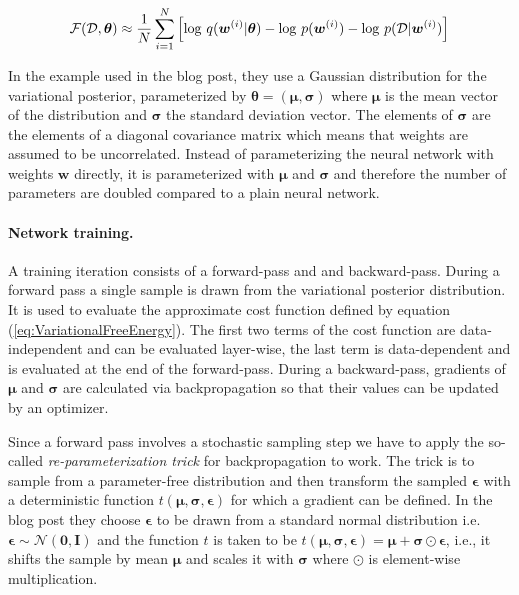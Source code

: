\documentclass[%
oneside,                 %
final,                   %
10pt]{article}
\begin{document}
\begin{equation} 
\mathcal{F}(\mathcal{D},\boldsymbol{\theta}) \approx {1 \over N} \sum_{i=1}^N \left[
\log \, q(\boldsymbol{w}^{(i)} \lvert \boldsymbol{\theta}) -
\log \, p(\boldsymbol{w}^{(i)}) -
\log \, p(\mathcal{D} \lvert \boldsymbol{w}^{(i)})\right]
\label{eq:VariationalFreeEnergy}
\end{equation}

In the example used in the blog post, they use a Gaussian distribution for the variational posterior, parameterized by $\boldsymbol{\theta} = (\boldsymbol{\mu}, \boldsymbol{\sigma})$ where $\boldsymbol{\mu}$ is the mean vector of the distribution and $\boldsymbol{\sigma}$ the standard deviation vector. The elements of $\boldsymbol{\sigma}$ are the elements of a diagonal covariance matrix which means that weights are assumed to be uncorrelated. Instead of parameterizing the neural network with weights $\boldsymbol{w}$ directly, it is parameterized with $\boldsymbol{\mu}$ and $\boldsymbol{\sigma}$ and therefore the number of parameters are doubled compared to a plain neural network.

\paragraph{Network training.}
A training iteration consists of a forward-pass and and backward-pass. During a forward pass a single sample is drawn from the variational posterior distribution. It is used to evaluate the approximate cost function defined by equation (\ref{eq:VariationalFreeEnergy}). The first two terms of the cost function are data-independent and can be evaluated layer-wise, the last term is data-dependent and is evaluated at the end of the forward-pass. During a backward-pass, gradients of $\boldsymbol{\mu}$ and $\boldsymbol{\sigma}$ are calculated via backpropagation so that their values can be updated by an optimizer.

Since a forward pass involves a stochastic sampling step we have to apply the so-called \emph{re-parameterization trick} for backpropagation to work. The trick is to sample from a parameter-free distribution and then transform the sampled $\boldsymbol{\epsilon}$ with a deterministic function $t(\boldsymbol{\mu}, \boldsymbol{\sigma}, \boldsymbol{\epsilon})$ for which a gradient can be defined. In the blog post they choose $\boldsymbol{\epsilon}$ to be drawn from a standard normal distribution i.e.~$\boldsymbol{\epsilon} \sim \mathcal{N}(\boldsymbol{0}, \boldsymbol{I})$ and the function $t$ is taken to be $t(\boldsymbol{\mu}, \boldsymbol{\sigma}, \boldsymbol{\epsilon}) = \boldsymbol{\mu} + \boldsymbol{\sigma} \odot \boldsymbol{\epsilon}$, i.e., it shifts the sample by mean $\boldsymbol{\mu}$ and scales it with $\boldsymbol{\sigma}$ where $\odot$ is element-wise multiplication.
\end{document}
